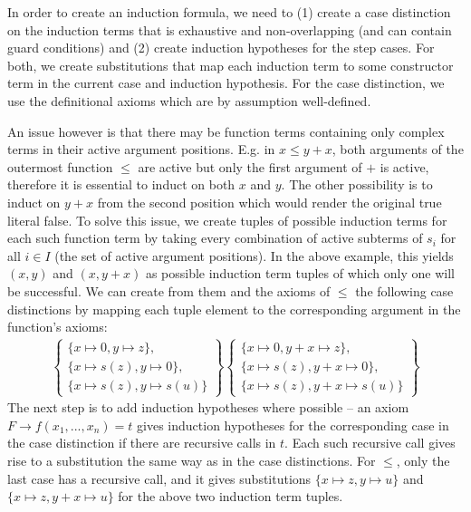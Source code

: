 In order to create an induction formula, we need to (1) create a case distinction on the induction terms that is exhaustive and non-overlapping (and can contain guard conditions) and (2) create induction hypotheses for the step cases. For both, we create substitutions that map each induction term to some constructor term in the current case and induction hypothesis. For the case distinction, we use the definitional axioms which are by assumption well-defined.

An issue however is that there may be function terms containing only complex terms in their active argument positions. E.g. in $x\leq y+x$, both arguments of the outermost function $\leq$ are active but only the first argument of $+$ is active, therefore it is essential to induct on both $x$ and $y$. The other possibility is to induct on $y+x$ from the second position which would render the original true literal false. To solve this issue, we create tuples of possible induction terms for each such function term by taking every combination of active subterms of $s_i$ for all $i\in I$ (the set of active argument positions). In the above example, this yields $(x,y)$ and $(x,y+x)$ as possible induction term tuples of which only one will be successful. We can create from them and the axioms of $\leq$ the following case distinctions by mapping each tuple element to the corresponding argument in the function's axioms:
$$\begin{matrix}\begin{Bmatrix}
\{x\mapsto 0, y\mapsto z\},\\
\{x\mapsto s(z), y\mapsto 0\},\\
\{x\mapsto s(z), y\mapsto s(u)\}
\end{Bmatrix}\begin{Bmatrix}
\{x\mapsto 0, y+x\mapsto z\},\\
\{x\mapsto s(z), y+x\mapsto 0\},\\
\{x\mapsto s(z), y+x\mapsto s(u)\}
\end{Bmatrix}\end{matrix}$$
The next step is to add induction hypotheses where possible -- an axiom $F\rightarrow f(x_1,...,x_n)=t$ gives induction hypotheses for the corresponding case in the case distinction if there are recursive calls in $t$. Each such recursive call gives rise to a substitution the same way as in the case distinctions. For $\leq$, only the last case has a recursive call, and it gives substitutions $\{x\mapsto z,y\mapsto u\}$ and $\{x\mapsto z,y+x\mapsto u\}$ for the above two induction term tuples.

